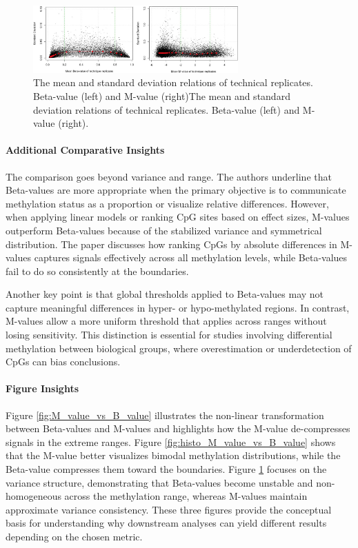 \documentclass[10pt]{extarticle}
\begin{document}
\begin{figure}[h]
    \centering
    \includegraphics[width=0.7\textwidth]{Figures/The mean and standard deviation relations of technical replicates. Beta-value (left) and M-value (right).jpg} %
    \caption{The mean and standard deviation relations of technical replicates. Beta-value (left) and M-value (right)The mean and standard deviation relations of technical replicates. Beta-value (left) and M-value (right).}
    \label{fig:mean_std_M_value_vs_B_value}
\end{figure}



\paragraph{Additional Comparative Insights}
The comparison goes beyond variance and range. The authors underline that Beta-values are more appropriate when the primary objective is to communicate methylation status as a proportion or visualize relative differences. However, when applying linear models or ranking CpG sites based on effect sizes, M-values outperform Beta-values because of the stabilized variance and symmetrical distribution. The paper discusses how ranking CpGs by absolute differences in M-values captures signals effectively across all methylation levels, while Beta-values fail to do so consistently at the boundaries.

Another key point is that global thresholds applied to Beta-values may not capture meaningful differences in hyper- or hypo-methylated regions. In contrast, M-values allow a more uniform threshold that applies across ranges without losing sensitivity. This distinction is essential for studies involving differential methylation between biological groups, where overestimation or underdetection of CpGs can bias conclusions.

\paragraph{Figure Insights}
Figure \ref{fig:M_value_vs_B_value} illustrates the non-linear transformation between Beta-values and M-values and highlights how the M-value de-compresses signals in the extreme ranges. Figure \ref{fig:histo_M_value_vs_B_value} shows that the M-value better visualizes bimodal methylation distributions, while the Beta-value compresses them toward the boundaries. Figure \ref{fig:mean_std_M_value_vs_B_value} focuses on the variance structure, demonstrating that Beta-values become unstable and non-homogeneous across the methylation range, whereas M-values maintain approximate variance consistency. These three figures provide the conceptual basis for understanding why downstream analyses can yield different results depending on the chosen metric.
\end{document}

